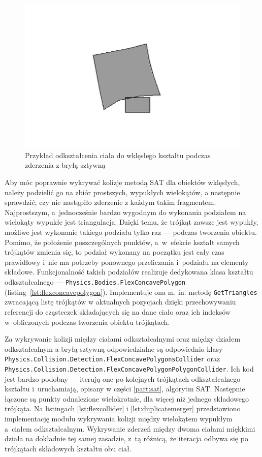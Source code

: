\begin{figure}[h]
	\centering
	\includegraphics[width=0.7\linewidth]{images/wkleslyflex}
	\caption{Przykład odkształcenia ciała do wklęsłego kształtu podczas zderzenia z bryłą sztywną}
	\label{fig:wkleslyflex}
\end{figure}

Aby móc poprawnie wykrywać kolizje metodą SAT dla obiektów wklęsłych, należy podzielić go na zbiór prostszych, wypukłych wielokątów, a następnie sprawdzić, czy nie nastąpiło zderzenie z każdym takim fragmentem. Najprostszym, a~jednocześnie bardzo wygodnym do wykonania podziałem na wielokąty wypukłe jest triangulacja. Dzięki temu, że trójkąt zawsze jest wypukły, możliwe jest wykonanie takiego podziału tylko raz --- podczas tworzenia obiektu. Pomimo, że położenie poszczególnych punktów, a~w~efekcie kształt samych trójkątów zmienia się, to podział wykonany na początku jest cały czas prawidłowy i~nie ma potrzeby ponownego przeliczania i~podziału na elementy składowe. Funkcjonalność takich podziałów realizuje dedykowana klasa kształtu odkształcalnego --- \verb|Physics.Bodies.FlexConcavePolygon| (listing~\ref{lst:flexconcavepolygon}). Implementuje ona m. in. metodę \verb|GetTriangles| zwracającą listę trójkątów w aktualnych pozycjach dzięki przechowywaniu referencji do cząsteczek składających się na dane ciało oraz ich indeksów w~obliczonych podczas tworzenia obiektu trójkątach.



Za wykrywanie kolizji między ciałami odkształcalnymi oraz między działem odkształcalnym a bryłą sztywną odpowiedzialne są odpowiednio klasy \verb|Physics.Collision.Detection.FlexConcavePolygonsCollider| oraz \verb|Physics.Collision.Detection.FlexConcavePolygonPolygonCollider|. Ich kod jest bardzo podobny --- iterują one po kolejnych trójkątach odkształcalnego kształtu i~uruchamiają, opisany w części \ref{part:sat}, algorytm SAT. Następnie łączone są punkty odnalezione wielokrotnie, dla więcej niż jednego składowego trójkąta. Na listingach \ref{lst:flexcollider} i \ref{lst:duplicatemerger} przedstawiono implementację modułu wykrywania kolizji między wielokątem wypukłym a~ciałem odkształcalnym. Wykrywanie zderzeń między dwoma ciałami miękkimi działa na dokładnie tej samej zasadzie, z~tą różnicą, że iteracja odbywa się po trójkątach składowych kształtu obu ciał.

